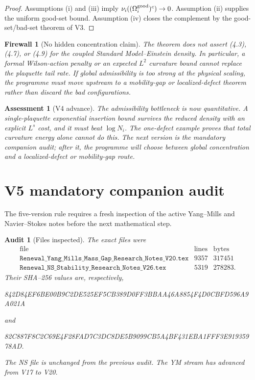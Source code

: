 \documentclass[11pt]{article}
\newtheorem{assessment}[theorem]{Assessment}
\newtheorem{firewall}[theorem]{Firewall}
\newtheorem{audit}[theorem]{Audit}
\begin{document}
\begin{proof}
Assumptions (i) and (iii) imply
\(\nu_i((\Omega_i^{\rm good})^c)\to0\).  Assumption (ii) supplies the
uniform good-set bound.  Assumption (iv) closes the complement by the
good-set/bad-set theorem of V3.
\end{proof}

\begin{firewall}[No hidden concentration claim]
\label{fw:v11v4-concentration}
The theorem does not assert (4.3), (4.7), or (4.9) for the coupled
Standard Model--Einstein density.  In particular, a formal Wilson-action
penalty or an expected \(L^2\) curvature bound cannot replace the
plaquette tail rate.  If global admissibility is too strong at the physical
scaling, the programme must move upstream to a mobility-gap or
localized-defect theorem rather than discard the bad configurations.
\end{firewall}

\begin{assessment}[V4 advance]
\label{ass:v11v4}
The admissibility bottleneck is now quantitative.  A single-plaquette
exponential insertion bound survives the reduced density with an explicit
\(L^s\) cost, and it must beat \(\log N_i\).  The one-defect example proves
that total curvature energy alone cannot do this.  The next version is the
mandatory companion audit; after it, the programme will choose between
global concentration and a localized-defect or mobility-gap route.
\end{assessment}


\section{V5 mandatory companion audit}
\label{sec:v11v5}

The five-version rule requires a fresh inspection of the active
Yang--Mills and Navier--Stokes notes before the next mathematical step.

\begin{audit}[Files inspected]
\label{audit:v11v5-files}
The exact files were
\[
\begin{array}{c|r|r}
\text{file}&\text{lines}&\text{bytes}\\ \hline
\texttt{Renewal\_Yang\_Mills\_Mass\_Gap\_Research\_Notes\_V20.tex}
&9357&317451\\
\texttt{Renewal\_NS\_Stability\_Research\_Notes\_V26.tex}
&5319&278283.
\end{array}
\]
Their SHA--256 values are, respectively,
\begin{center}
\small\ttfamily
842D84EF6BE00B9C2DE525EF5CB389D0FF3BBAA46A8854F4D0CBFD596A9A021A
\end{center}
and
\begin{center}
\small\ttfamily
82C887F8C2C69E4F28FAD7C3DC8DE5B9099CB5A4BF431EBA1FFF3E91935978AD.
\end{center}
The NS file is unchanged from the previous audit.  The YM stream has
advanced from V17 to V20.
\end{audit}
\end{document}
